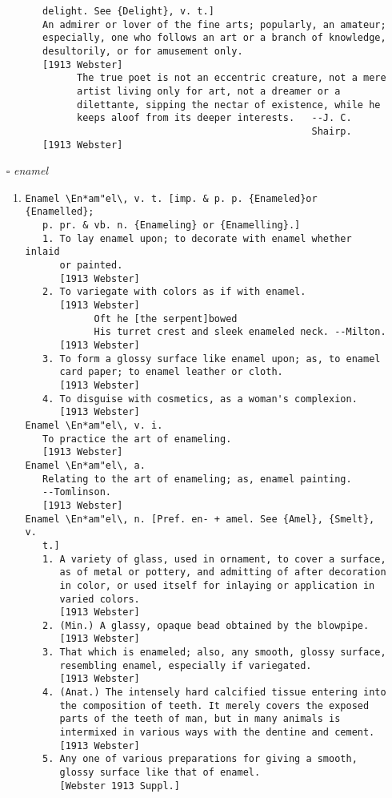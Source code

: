 \documentclass{article}
\begin{document}
\begin{itemize}
\begin{enumerate}
{\begin{lstlisting}
   delight. See {Delight}, v. t.]
   An admirer or lover of the fine arts; popularly, an amateur;
   especially, one who follows an art or a branch of knowledge,
   desultorily, or for amusement only.
   [1913 Webster]
         The true poet is not an eccentric creature, not a mere
         artist living only for art, not a dreamer or a
         dilettante, sipping the nectar of existence, while he
         keeps aloof from its deeper interests.   --J. C.
                                                  Shairp.
   [1913 Webster]
\end{lstlisting}}
\end{enumerate}
\item[$\square$] \emph{ enamel }
\begin{enumerate}
\item{
\begin{lstlisting}
Enamel \En*am"el\, v. t. [imp. & p. p. {Enameled}or {Enamelled};
   p. pr. & vb. n. {Enameling} or {Enamelling}.]
   1. To lay enamel upon; to decorate with enamel whether inlaid
      or painted.
      [1913 Webster]
   2. To variegate with colors as if with enamel.
      [1913 Webster]
            Oft he [the serpent]bowed
            His turret crest and sleek enameled neck. --Milton.
      [1913 Webster]
   3. To form a glossy surface like enamel upon; as, to enamel
      card paper; to enamel leather or cloth.
      [1913 Webster]
   4. To disguise with cosmetics, as a woman's complexion.
      [1913 Webster]
Enamel \En*am"el\, v. i.
   To practice the art of enameling.
   [1913 Webster]
Enamel \En*am"el\, a.
   Relating to the art of enameling; as, enamel painting.
   --Tomlinson.
   [1913 Webster]
Enamel \En*am"el\, n. [Pref. en- + amel. See {Amel}, {Smelt}, v.
   t.]
   1. A variety of glass, used in ornament, to cover a surface,
      as of metal or pottery, and admitting of after decoration
      in color, or used itself for inlaying or application in
      varied colors.
      [1913 Webster]
   2. (Min.) A glassy, opaque bead obtained by the blowpipe.
      [1913 Webster]
   3. That which is enameled; also, any smooth, glossy surface,
      resembling enamel, especially if variegated.
      [1913 Webster]
   4. (Anat.) The intensely hard calcified tissue entering into
      the composition of teeth. It merely covers the exposed
      parts of the teeth of man, but in many animals is
      intermixed in various ways with the dentine and cement.
      [1913 Webster]
   5. Any one of various preparations for giving a smooth,
      glossy surface like that of enamel.
      [Webster 1913 Suppl.]

\end{lstlisting}}
\end{enumerate}
\end{itemize}
\end{document}
